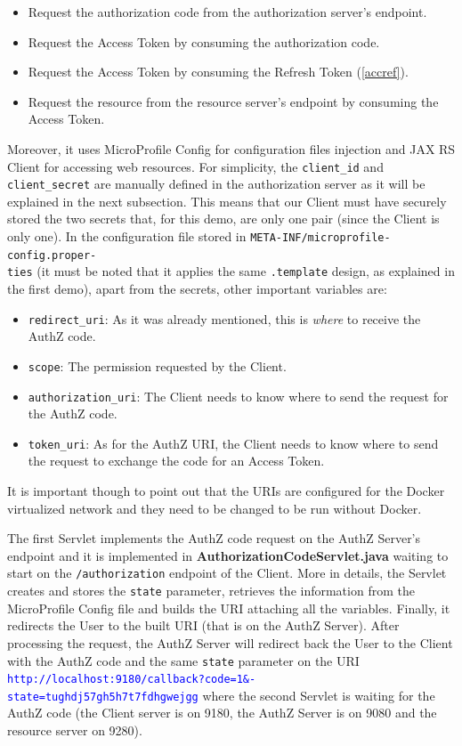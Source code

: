 \documentclass[a4paper,12pt]{article}
\begin{document}
\begin{itemize}
    \item Request the authorization code from the authorization server's endpoint.
    \item Request the Access Token by consuming the authorization code.
    \item Request the Access Token by consuming the Refresh Token (\ref{accref}).
    \item Request the resource from the resource server's endpoint by consuming the Access Token.
\end{itemize}

Moreover, it uses MicroProfile Config for configuration files injection and JAX RS Client for accessing web resources. For simplicity, the \texttt{client\_id} and \texttt{client\_secret} are manually defined in the authorization server as it will be explained in the next subsection. This means that our Client must have securely stored the two secrets that, for this demo, are only one pair (since the Client is only one). In the configuration file stored in \texttt{META-INF/microprofile-config.proper-\\ties} (it must be noted that it applies the same \texttt{.template} design, as explained in the first demo), apart from the secrets, other important variables are:

\begin{itemize}
    \item \texttt{redirect\_uri}: As it was already mentioned, this is \textit{where} to receive the AuthZ code.
    \item \texttt{scope}: The permission requested by the Client.
    \item \texttt{authorization\_uri}: The Client needs to know where to send the request for the AuthZ code.
    \item \texttt{token\_uri}: As for the AuthZ URI, the Client needs to know where to send the request to exchange the code for an Access Token.
\end{itemize}

It is important though to point out that the URIs are configured for the Docker virtualized network and they need to be changed to be run without Docker.

The first Servlet implements the AuthZ code request on the AuthZ Server's endpoint and it is implemented in \textbf{AuthorizationCodeServlet.java} waiting to start on the \texttt{/authorization} endpoint of the Client. More in details, the Servlet creates and stores the \texttt{state} parameter, retrieves the information from the MicroProfile Config file and builds the URI attaching all the variables. Finally, it redirects the User to the built URI (that is on the AuthZ Server). After processing the request, the AuthZ Server will redirect back the User to the Client with the AuthZ code and the same \texttt{state} parameter on the URI \textcolor{blue}{\texttt{http://localhost:9180/callback?code=1\&-\\state=tughdj57gh5h7t7fdhgwejgg}} where the second Servlet is waiting for the AuthZ code (the Client server is on 9180, the AuthZ Server is on 9080 and the resource server on 9280).
\end{document}
